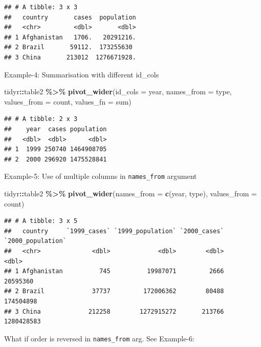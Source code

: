 \documentclass[
]{book}
\newenvironment{Shaded}{\begin{snugshade}}{\end{snugshade}}
\newcommand{\AttributeTok}[1]{\textcolor[rgb]{0.13,0.29,0.53}{#1}}
\newcommand{\FunctionTok}[1]{\textcolor[rgb]{0.13,0.29,0.53}{\textbf{#1}}}
\newcommand{\NormalTok}[1]{#1}
\newcommand{\SpecialCharTok}[1]{\textcolor[rgb]{0.81,0.36,0.00}{\textbf{#1}}}
\begin{document}
\begin{verbatim}
## # A tibble: 3 x 3
##   country       cases  population
##   <chr>         <dbl>       <dbl>
## 1 Afghanistan   1706.   20291216.
## 2 Brazil       59112.  173255630 
## 3 China       213012  1276671928.
\end{verbatim}

Example-4: Summarisation with different id\_cols

\begin{Shaded}
\begin{Highlighting}[]
\NormalTok{tidyr}\SpecialCharTok{::}\NormalTok{table2 }\SpecialCharTok{\%\textgreater{}\%} 
  \FunctionTok{pivot\_wider}\NormalTok{(}\AttributeTok{id\_cols =}\NormalTok{ year,}
              \AttributeTok{names\_from =}\NormalTok{ type,}
              \AttributeTok{values\_from =}\NormalTok{ count,}
              \AttributeTok{values\_fn =}\NormalTok{ sum)}
\end{Highlighting}
\end{Shaded}

\begin{verbatim}
## # A tibble: 2 x 3
##    year  cases population
##   <dbl>  <dbl>      <dbl>
## 1  1999 250740 1464908705
## 2  2000 296920 1475528841
\end{verbatim}

Example-5: Use of multiple columns in \texttt{names\_from} argument

\begin{Shaded}
\begin{Highlighting}[]
\NormalTok{tidyr}\SpecialCharTok{::}\NormalTok{table2 }\SpecialCharTok{\%\textgreater{}\%} 
  \FunctionTok{pivot\_wider}\NormalTok{(}\AttributeTok{names\_from =} \FunctionTok{c}\NormalTok{(year, type),}
               \AttributeTok{values\_from =}\NormalTok{ count)}
\end{Highlighting}
\end{Shaded}

\begin{verbatim}
## # A tibble: 3 x 5
##   country     `1999_cases` `1999_population` `2000_cases` `2000_population`
##   <chr>              <dbl>             <dbl>        <dbl>             <dbl>
## 1 Afghanistan          745          19987071         2666          20595360
## 2 Brazil             37737         172006362        80488         174504898
## 3 China             212258        1272915272       213766        1280428583
\end{verbatim}

What if order is reversed in \texttt{names\_from} arg. See Example-6:
\end{document}
